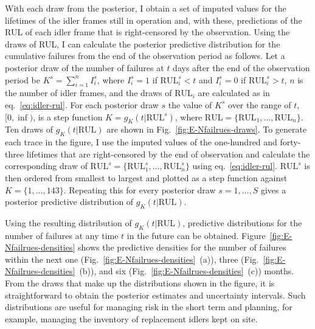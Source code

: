 With each draw from the posterior, I obtain a set of imputed values for the lifetimes of the idler frames still in operation and, with these, predictions of the RUL of each idler frame that is right-censored by the observation. Using the draws of RUL, I can calculate the posterior predictive distribution for the cumulative failures from the end of the observation period as follows. Let a posterior draw of the number of failures at $t$ days after the end of the observation period be $K^s = \sum^{n}_{i = 1}I^s_i$, where $I^s_i = 1$ if $\text{RUL}^s_i < t$ and $I^s_i = 0$ if $\text{RUL}^s_i > t$, $n$ is the number of idler frames, and the draws of $\text{RUL}_i$ are calculated as in eq.~\eqref{eq:idler-rul}. For each posterior draw $s$ the value of $K^s$ over the range of $t$, $[0, \inf)$, is a step function $K = g_K(t|\text{RUL}^s)$, where $\text{RUL} = \{\text{RUL}_1, \dots, \text{RUL}_n\}$. Ten draws of $g_K(t|\text{RUL})$ are shown in Fig.~\ref{fig:E-Nfailrues-draws}. To generate each trace in the figure, I use the imputed values of the one-hundred and forty-three lifetimes that are right-censored by the end of observation and calculate the corresponding draw of $\text{RUL}^s = \{\text{RUL}^s_1, \dots, \text{RUL}^s_n\}$ using eq.~\eqref{eq:idler-rul}. $\text{RUL}^s$ is then ordered from smallest to largest and plotted as a step function against $K = \{1, \dots, 143\}$. Repeating this for every posterior draw $s = 1, \dots, S$ gives a posterior predictive distribution of $g_K(t|\text{RUL})$.

Using the resulting distribution of $g_K(t|\text{RUL})$, predictive distributions for the number of failures at any time $t$ in the future can be obtained. Figure~\ref{fig:E-Nfailrues-densities} shows the predictive densities for the number of failures within the next one (Fig.~\ref{fig:E-Nfailrues-densities}~(a)), three (Fig.~\ref{fig:E-Nfailrues-densities}~(b)), and six (Fig.~\ref{fig:E-Nfailrues-densities}~(c)) months. From the draws that make up the distributions shown in the figure, it is straightforward to obtain the posterior estimates and uncertainty intervals. Such distributions are useful for managing risk in the short term and planning, for example, managing the inventory of replacement idlers kept on site.

